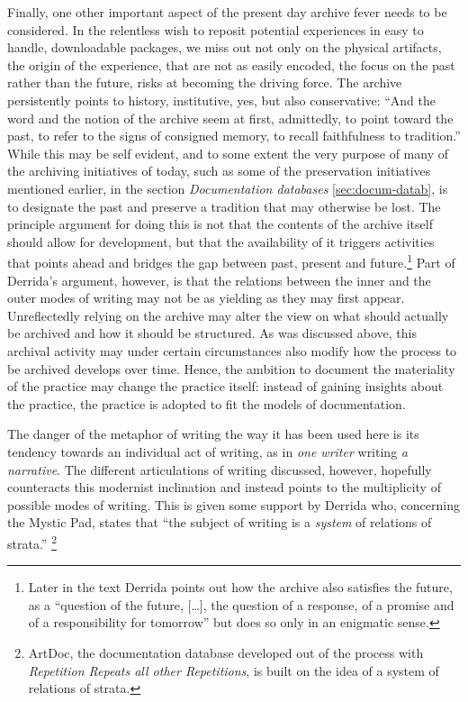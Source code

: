 \documentclass[11pt,a4paper]{article}
\begin{document}
Finally, one other important aspect of the present day archive fever needs to be considered. In the relentless wish to reposit potential experiences in easy to handle, downloadable packages, we miss out not only on the physical artifacts, the origin of the experience, that are not as easily encoded, the focus on the past rather than the future, risks at becoming the driving force. The archive persistently points to history, institutive, yes, but also conservative: ``And the word and the notion of the archive seem at first, admittedly, to point toward the past, to refer to the signs of consigned memory, to recall faithfulness to tradition.'' \citep[p. 33]{derrida1998} While this may be self evident, and to some extent the very purpose of many of the archiving initiatives of today, such as some of the preservation initiatives mentioned earlier, in the section \emph{Documentation databases} \ref{sec:docum-datab}, is to designate the past and preserve a tradition that may otherwise be lost. The principle argument for doing this is not that the contents of the archive itself should  allow for development, but that the availability of it triggers activities that points ahead and bridges the gap between past, present and future.\footnote{Later in the text Derrida points out how the archive also satisfies the future, as a ``question of the future, [\ldots], the question of a response, of a promise and of a responsibility for tomorrow'' \citep[p. 36]{der78} but does so only in an enigmatic sense.} Part of Derrida's argument, however, is that the relations between the inner and the outer modes of writing may not be as yielding as they may first appear. Unreflectedly relying on the archive may alter the view on what should actually be archived and how it should be structured. As was discussed above, this archival activity may under certain circumstances also modify how the process to be archived develops over time. Hence, the ambition to document the materiality of the practice may change the practice itself: instead of gaining insights about the practice, the practice is adopted to fit the models of documentation.

The danger of the metaphor of writing the way it has been used here is its tendency towards an individual act of writing, as in \emph{one writer} writing \emph{a narrative}. The different articulations of writing discussed, however, hopefully counteracts this modernist inclination and instead points to the multiplicity of possible modes of writing. This is given some support by Derrida who, concerning the Mystic Pad, states that ``the subject of writing is a \emph{system} of relations of strata.'' \citep[p. 285]{der78}\footnote{ArtDoc, the documentation database developed out of the process with \emph{Repetition Repeats all other Repetitions}, is built on the idea of a system of relations of strata.} 
\end{document}
